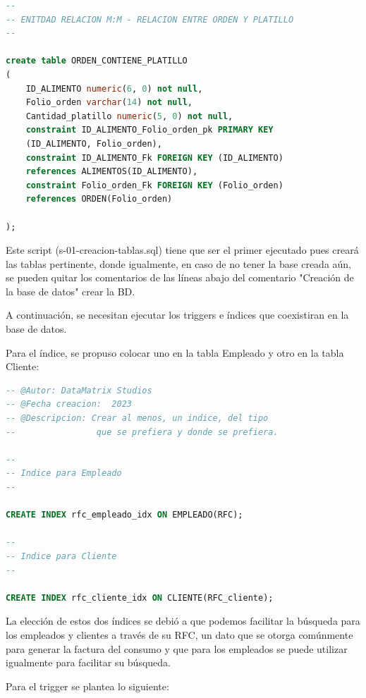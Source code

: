 \documentclass[12pt, letterpaper]{article} %
\begin{document}
\begin{lstlisting}[language=SQL, caption=Creación de las tablas que almacenarán la información.]
--
-- ENITDAD RELACION M:M - RELACION ENTRE ORDEN Y PLATILLO
--

create table ORDEN_CONTIENE_PLATILLO
(
	ID_ALIMENTO numeric(6, 0) not null,
	Folio_orden varchar(14) not null,
	Cantidad_platillo numeric(5, 0) not null,
	constraint ID_ALIMENTO_Folio_orden_pk PRIMARY KEY
    (ID_ALIMENTO, Folio_orden),
	constraint ID_ALIMENTO_Fk FOREIGN KEY (ID_ALIMENTO)
    references ALIMENTOS(ID_ALIMENTO),
	constraint Folio_orden_Fk FOREIGN KEY (Folio_orden)
    references ORDEN(Folio_orden)

);
\end{lstlisting}

Este script (s-01-creacion-tablas.sql) tiene que ser el primer ejecutado pues creará las tablas pertinente, donde igualmente, en caso de no tener la base creada aún, se pueden quitar los comentarios de las líneas abajo del comentario "Creación de la base de datos" crear la BD.

A continuación, se necesitan ejecutar los triggers e índices que coexistiran en la base de datos.

Para el índice, se propuso colocar uno en la tabla Empleado y otro en la tabla Cliente:

\begin{lstlisting}[language=SQL, caption=Creación de índece para empleado y cliente.]
-- @Autor: DataMatrix Studios
-- @Fecha creacion:  2023
-- @Descripcion: Crear al menos, un indice, del tipo
--                que se prefiera y donde se prefiera.

--
-- Indice para Empleado
--

CREATE INDEX rfc_empleado_idx ON EMPLEADO(RFC);

--
-- Indice para Cliente
--

CREATE INDEX rfc_cliente_idx ON CLIENTE(RFC_cliente);
\end{lstlisting}

La elección de estos dos índices se debió a que podemos facilitar la búsqueda para los empleados y clientes a través de su RFC, un dato que se otorga comúnmente para generar la factura del consumo y que para los empleados se puede utilizar igualmente para facilitar su búsqueda.

Para el trigger se plantea lo siguiente:
\end{document}
